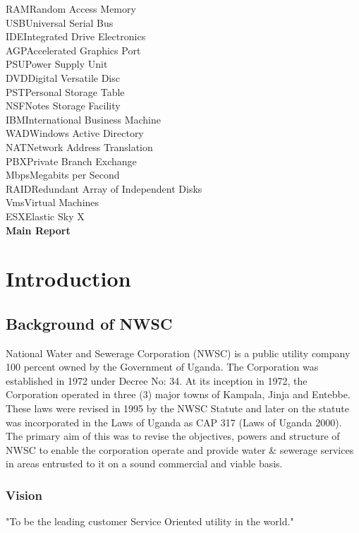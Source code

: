\documentclass{article}
\begin{document}
RAM\dotfill Random Access Memory\\
USB\dotfill Universal Serial Bus\\
IDE\dotfill Integrated Drive Electronics\\
AGP\dotfill Accelerated Graphics Port\\
PSU\dotfill Power Supply Unit\\
DVD\dotfill Digital Versatile Disc\\
PST\dotfill Personal Storage Table\\
NSF\dotfill Notes Storage Facility\\
IBM\dotfill International Business Machine\\
WAD\dotfill Windows Active Directory\\
NAT\dotfill Network Address Translation\\
PBX\dotfill Private Branch Exchange\\
Mbps\dotfill Megabits per Second\\
RAID\dotfill Redundant Array of Independent Disks\\
Vms\dotfill Virtual Machines\\
ESX\dotfill Elastic Sky X\\
\thispagestyle{empty}
\newpage
\setcounter{page}{1}
\textbf{Main Report}\\
\section{Introduction}
\subsection{Background of NWSC}\cite{nwscwebsite}
National Water and Sewerage Corporation (NWSC) is a public utility company 100 percent owned by the Government of Uganda. The Corporation was established in 1972 under Decree No: 34. At its inception in 1972, the Corporation operated in three (3) major towns of Kampala, Jinja and Entebbe. These laws were revised in 1995 by the NWSC Statute and later on the statute was incorporated in the Laws of Uganda as CAP 317 (Laws of Uganda 2000). The primary aim of this was to revise the objectives, powers and structure of NWSC to enable the corporation operate and provide water \& sewerage services in areas entrusted to it on a sound commercial and viable basis.
\subsubsection{Vision}
"To be the leading customer Service Oriented utility in the world." 
\end{document}
